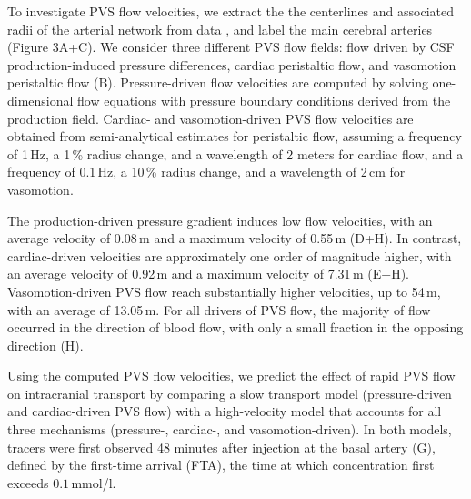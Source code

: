 \documentclass[fleqn,10pt]{wlscirep}
\begin{document}

To investigate PVS flow velocities, we extract the the centerlines and associated radii of the arterial network from data \cite{hodneland2019new}, and label the main cerebral arteries (Figure 3A+C). We consider three different PVS flow fields: flow driven by CSF production-induced pressure differences, cardiac peristaltic flow, and vasomotion peristaltic flow (B). Pressure-driven flow velocities are computed by solving one-dimensional flow equations with pressure boundary conditions derived from the production field. Cardiac- and vasomotion-driven PVS flow velocities are obtained from semi-analytical estimates for peristaltic flow, assuming a frequency of 1\,Hz, a 1\,\% radius change, and a wavelength of 2 meters for cardiac flow, and a frequency of 0.1\,Hz, a 10\,\% radius change, and a wavelength of 2\,cm for vasomotion.

The production-driven pressure gradient induces low flow velocities, with an average velocity of 0.08\,\textmu m and a maximum velocity of 0.55\,\textmu m (D+H). In contrast, cardiac-driven velocities are approximately one order of magnitude higher, with an average velocity of 0.92\,\textmu m and a maximum velocity of 7.31\,\textmu m (E+H). Vasomotion-driven PVS flow reach substantially higher velocities, up to 54\,\textmu m, with an average of 13.05\,\textmu m. For all drivers of PVS flow, the majority of flow occurred in the direction of blood flow, with only a small fraction in the opposing direction (H).


Using the computed PVS flow velocities, we predict the effect of rapid PVS flow on intracranial transport by comparing a slow transport model (pressure-driven and cardiac-driven PVS flow) with a high-velocity model that accounts for all three mechanisms (pressure-, cardiac-, and vasomotion-driven). In both models, tracers were first observed 48 minutes after injection at the basal artery (G), defined by the first-time arrival (FTA), the time at which concentration first exceeds $0.1\,$mmol/l.
\end{document}
